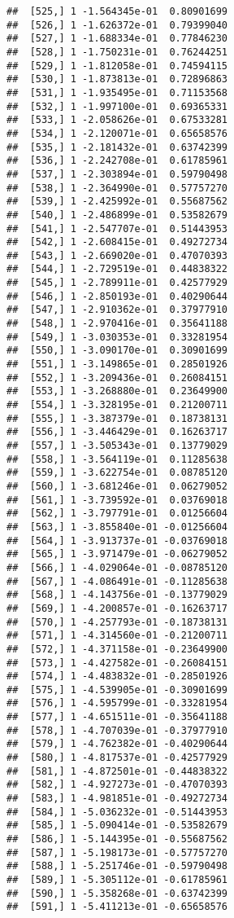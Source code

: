 \documentclass[
  12pt,
]{article}
\begin{document}
\begin{verbatim}
##  [525,] 1 -1.564345e-01  0.80901699
##  [526,] 1 -1.626372e-01  0.79399040
##  [527,] 1 -1.688334e-01  0.77846230
##  [528,] 1 -1.750231e-01  0.76244251
##  [529,] 1 -1.812058e-01  0.74594115
##  [530,] 1 -1.873813e-01  0.72896863
##  [531,] 1 -1.935495e-01  0.71153568
##  [532,] 1 -1.997100e-01  0.69365331
##  [533,] 1 -2.058626e-01  0.67533281
##  [534,] 1 -2.120071e-01  0.65658576
##  [535,] 1 -2.181432e-01  0.63742399
##  [536,] 1 -2.242708e-01  0.61785961
##  [537,] 1 -2.303894e-01  0.59790498
##  [538,] 1 -2.364990e-01  0.57757270
##  [539,] 1 -2.425992e-01  0.55687562
##  [540,] 1 -2.486899e-01  0.53582679
##  [541,] 1 -2.547707e-01  0.51443953
##  [542,] 1 -2.608415e-01  0.49272734
##  [543,] 1 -2.669020e-01  0.47070393
##  [544,] 1 -2.729519e-01  0.44838322
##  [545,] 1 -2.789911e-01  0.42577929
##  [546,] 1 -2.850193e-01  0.40290644
##  [547,] 1 -2.910362e-01  0.37977910
##  [548,] 1 -2.970416e-01  0.35641188
##  [549,] 1 -3.030353e-01  0.33281954
##  [550,] 1 -3.090170e-01  0.30901699
##  [551,] 1 -3.149865e-01  0.28501926
##  [552,] 1 -3.209436e-01  0.26084151
##  [553,] 1 -3.268880e-01  0.23649900
##  [554,] 1 -3.328195e-01  0.21200711
##  [555,] 1 -3.387379e-01  0.18738131
##  [556,] 1 -3.446429e-01  0.16263717
##  [557,] 1 -3.505343e-01  0.13779029
##  [558,] 1 -3.564119e-01  0.11285638
##  [559,] 1 -3.622754e-01  0.08785120
##  [560,] 1 -3.681246e-01  0.06279052
##  [561,] 1 -3.739592e-01  0.03769018
##  [562,] 1 -3.797791e-01  0.01256604
##  [563,] 1 -3.855840e-01 -0.01256604
##  [564,] 1 -3.913737e-01 -0.03769018
##  [565,] 1 -3.971479e-01 -0.06279052
##  [566,] 1 -4.029064e-01 -0.08785120
##  [567,] 1 -4.086491e-01 -0.11285638
##  [568,] 1 -4.143756e-01 -0.13779029
##  [569,] 1 -4.200857e-01 -0.16263717
##  [570,] 1 -4.257793e-01 -0.18738131
##  [571,] 1 -4.314560e-01 -0.21200711
##  [572,] 1 -4.371158e-01 -0.23649900
##  [573,] 1 -4.427582e-01 -0.26084151
##  [574,] 1 -4.483832e-01 -0.28501926
##  [575,] 1 -4.539905e-01 -0.30901699
##  [576,] 1 -4.595799e-01 -0.33281954
##  [577,] 1 -4.651511e-01 -0.35641188
##  [578,] 1 -4.707039e-01 -0.37977910
##  [579,] 1 -4.762382e-01 -0.40290644
##  [580,] 1 -4.817537e-01 -0.42577929
##  [581,] 1 -4.872501e-01 -0.44838322
##  [582,] 1 -4.927273e-01 -0.47070393
##  [583,] 1 -4.981851e-01 -0.49272734
##  [584,] 1 -5.036232e-01 -0.51443953
##  [585,] 1 -5.090414e-01 -0.53582679
##  [586,] 1 -5.144395e-01 -0.55687562
##  [587,] 1 -5.198173e-01 -0.57757270
##  [588,] 1 -5.251746e-01 -0.59790498
##  [589,] 1 -5.305112e-01 -0.61785961
##  [590,] 1 -5.358268e-01 -0.63742399
##  [591,] 1 -5.411213e-01 -0.65658576

\end{verbatim}
\end{document}
